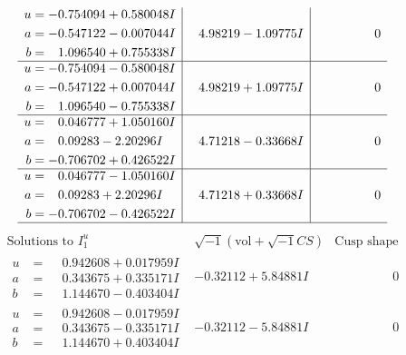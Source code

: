 \documentclass[1p]{elsarticle_modified}
\theoremstyle{definition}
\newcommand{\I}{\sqrt{-1}}
\begin{document}
$$\begin{array}{c|c|c}
\begin{aligned}
u &= -0.754094 + 0.580048 I \\
a &= -0.547122 - 0.007044 I \\
b &= \phantom{-}1.096540 + 0.755338 I\end{aligned}
 & \phantom{-}4.98219 - 1.09775 I & \phantom{-0.000000 } 0 \\ \hline\begin{aligned}
u &= -0.754094 - 0.580048 I \\
a &= -0.547122 + 0.007044 I \\
b &= \phantom{-}1.096540 - 0.755338 I\end{aligned}
 & \phantom{-}4.98219 + 1.09775 I & \phantom{-0.000000 } 0 \\ \hline\begin{aligned}
u &= \phantom{-}0.046777 + 1.050160 I \\
a &= \phantom{-}0.09283 - 2.20296 I \\
b &= -0.706702 + 0.426522 I\end{aligned}
 & \phantom{-}4.71218 - 0.33668 I & \phantom{-0.000000 } 0 \\ \hline\begin{aligned}
u &= \phantom{-}0.046777 - 1.050160 I \\
a &= \phantom{-}0.09283 + 2.20296 I \\
b &= -0.706702 - 0.426522 I\end{aligned}
 & \phantom{-}4.71218 + 0.33668 I & \phantom{-0.000000 } 0\\
 \hline 
 \end{array}$$\newpage$$\begin{array}{c|c|c}  
\text{Solutions to }I^u_{1}& \I (\text{vol} + \sqrt{-1}CS) & \text{Cusp shape}\\
 \hline 
\begin{aligned}
u &= \phantom{-}0.942608 + 0.017959 I \\
a &= \phantom{-}0.343675 + 0.335171 I \\
b &= \phantom{-}1.144670 - 0.403404 I\end{aligned}
 & -0.32112 + 5.84881 I & \phantom{-0.000000 } 0 \\ \hline\begin{aligned}
u &= \phantom{-}0.942608 - 0.017959 I \\
a &= \phantom{-}0.343675 - 0.335171 I \\
b &= \phantom{-}1.144670 + 0.403404 I\end{aligned}
 & -0.32112 - 5.84881 I & \phantom{-0.000000 } 0 \\ \hline\begin{aligned}

\end{aligned}
\end{array}$$
\end{document}
